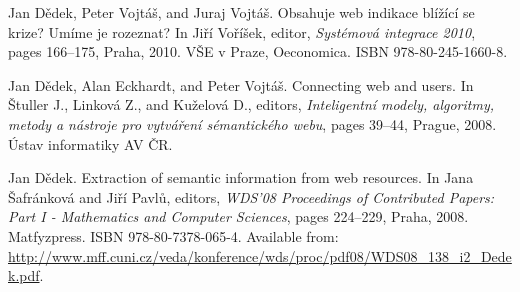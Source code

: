 \begin{description}
\item
Jan D{\v{e}}dek, Peter Vojt{\'{a}}{\v{s}}, and Juraj Vojt{\'{a}}{\v{s}}.
\newblock Obsahuje web indikace bl\'{i}\v{z}\'{i}c\'{i} se krize? {U}m\'{i}me
  je rozeznat?
\newblock In Ji\v{r}\'{i} Vo\v{r}\'{i}\v{s}ek, editor, {\em Syst\'{e}mov\'{a}
  integrace 2010}, pages 166--175, Praha, 2010. V{\v{S}}E v Praze, Oeconomica.
\newblock ISBN 978-80-245-1660-8.


\item
Jan D{\v{e}}dek, Alan Eckhardt, and Peter Vojt{\'{a}}{\v{s}}.
\newblock Connecting web and users.
\newblock In \v{S}tuller J., Linkov\'{a} Z., and Ku\v{z}elov\'{a} D., editors,
  {\em Inteligentn\'{i} modely, algoritmy, metody a n\'{a}stroje pro
  vytv\'{a}\v{r}en\'{i} s\'{e}mantick\'{e}ho webu}, pages 39--44, Prague, 2008.
  \'{U}stav informatiky AV \v{C}R.


\item
Jan D{\v{e}}dek.
\newblock Extraction of semantic information from web resources.
\newblock In Jana {\v{S}}afr{\'{a}}nkov{\'{a}} and Ji{\v{r}}{\'{i}}
  Pavl{\r{u}}, editors, {\em {WDS}'08 Proceedings of Contributed Papers: Part I
  - Mathematics and Computer Sciences}, pages 224--229, Praha, 2008.
  Matfyzpress.
\newblock ISBN 978-80-7378-065-4.
\newblock Available from:
  \url{http://www.mff.cuni.cz/veda/konference/wds/proc/pdf08/WDS08_138_i2_Dedek.pdf}.



\end{description}

